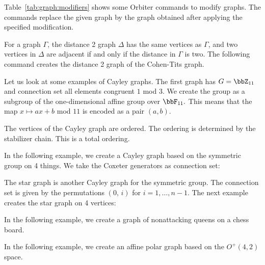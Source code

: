 \bigskip

Table~\ref{tab:graph:modifiers} 
shows some Orbiter commands to modify graphs.
The commands replace the given graph 
by the graph obtained after applying the specified modification.

\bigskip


For a graph $\Gamma$, the distance 2 graph $\Delta$ 
has the same vertices as $\Gamma$, 
and two vertices in $\Delta$ are adjacent 
if and only if the distance in $\Gamma$ is two.
The following command creates 
the distance 2 graph of the Cohen-Tits graph. 





\bigskip


Let us look at some examples of Cayley graphs. 
The first graph has $G = \bbZ_{11}$ 
and connection set all elements congruent $1$ mod $3$. 
We create the group as a subgroup of 
the one-dimensional affine group over $\bbF_{11}.$ 
This means that the map $x \mapsto ax+b$ mod $11$ 
is encoded as a pair $(a,b).$  


The vertices of the Cayley graph are ordered. 
The ordering is determined by the stabilizer chain. 
This is a total ordering.

\bigskip


In the following example, we create a Cayley graph 
based on the symmetric group on 4 things. 
We take the Coxeter generators as connection set:


The star graph is another Cayley graph for the symmetric group. 
The connection set is given by the permutations 
$(0,\,i)$ for $i=1,\ldots,n-1.$
The next example creates the star graph on 4 vertices:




\bigskip

In the following example, 
we create a graph of nonattacking queens on a chess board.


\bigskip


In the following example, 
we create an affine polar graph based on the $O^+(4,2)$ space.


\bigskip


